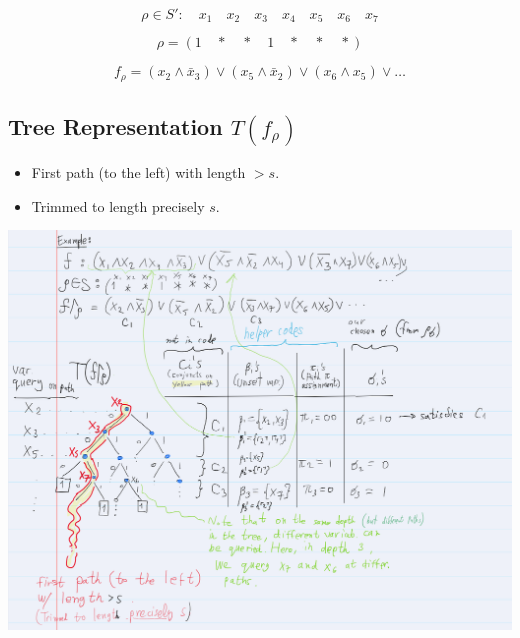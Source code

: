 \[
\rho \in S' : \quad x_1 \quad x_2 \quad x_3 \quad x_4 \quad x_5 \quad x_6 \quad x_7
\]

\[
\rho = (1 \quad * \quad * \quad 1 \quad * \quad * \quad *)
\]

\[
f_{\rho} = (x_2 \wedge \bar{x}_3) \vee (x_5 \wedge \bar{x}_2) \vee (x_6 \wedge x_5) \vee \dots
\]

\subsection*{Tree Representation \(T(f_{\rho})\)}

\begin{itemize}
    \item First path (to the left) with length \( > s \).
    \item Trimmed to length precisely \( s \).
\end{itemize}



\includegraphics[width=\textwidth]{images/coding-sl-ex1.png}


